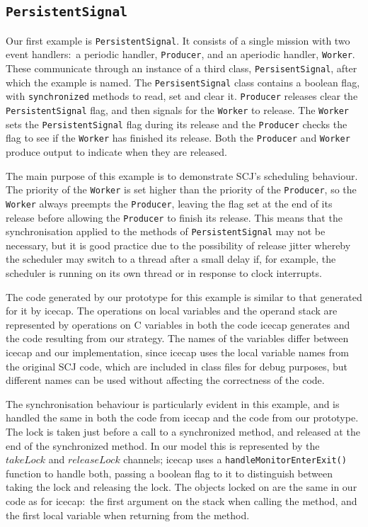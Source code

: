 \subsection{\texorpdfstring{\texttt{PersistentSignal}}{PersistentSignal}}
\label{persistent-signal-subsection}

Our first example is \texttt{PersistentSignal}. 
It consists of a single mission with two event handlers:~a periodic
handler, \texttt{Producer}, and an aperiodic handler, \texttt{Worker}.
These communicate through an instance of a third class,
\texttt{PersisentSignal}, after which the example is named.
The \texttt{PersisentSignal} class contains a boolean flag, with
\texttt{synchronized} methods to read, set and clear it.
\texttt{Producer} releases clear the \texttt{PersistentSignal} flag,
and then signals for the \texttt{Worker} to release.
The \texttt{Worker} sets the \texttt{PersistentSignal} flag during its
release and the \texttt{Producer} checks the flag to see if the
\texttt{Worker} has finished its release.
Both the \texttt{Producer} and \texttt{Worker} produce output to
indicate when they are released.

The main purpose of this example is to demonstrate SCJ's scheduling
behaviour.
The priority of the \texttt{Worker} is set higher than the priority of
the \texttt{Producer}, so the \texttt{Worker} always preempts the
\texttt{Producer}, leaving the flag set at the end of its release
before allowing the \texttt{Producer} to finish its release.
This means that the synchronisation applied to the methods of
\texttt{PersistentSignal} may not be necessary, but it is good
practice due to the possibility of release jitter whereby the
scheduler may switch to a thread after a small delay if, for example,
the scheduler is running on its own thread or in response to clock
interrupts.

The code generated by our prototype for this example is similar to
that generated for it by icecap.
The operations on local variables and the operand stack are
represented by operations on C variables in both the code icecap
generates and the code resulting from our strategy. 
The names of the variables differ between icecap and our
implementation, since icecap uses the local variable names from the
original SCJ code, which are included in class files for debug
purposes, but different names can be used without affecting the
correctness of the code.

The synchronisation behaviour is particularly evident in this example,
and is handled the same in both the code from icecap and the code from
our prototype.
The lock is taken just before a call to a synchronized method, and
released at the end of the synchronized method.
In our model this is represented by the $takeLock$ and $releaseLock$
channels; icecap uses a \texttt{handleMonitorEnterExit()} function to
handle both, passing a boolean flag to it to distinguish between taking
the lock and releasing the lock.
The objects locked on are the same in our code as for icecap:~the
first argument on the stack when calling the method, and the first
local variable when returning from the method.

